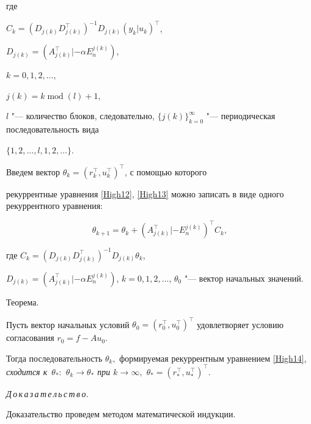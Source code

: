 где 

$C_{k}=(D_{j(k)}D^{\top}_{j(k)})^{-1}D_{j(k)}(y_{k}|u_{k})^{\top}$, 

$D_{j(k)}=(A^{\top}_{j(k)}|-\alpha E^{j(k)}_{n})$,

$k=0, 1, 2,\ldots$,

$j(k)=k \mathop{\mathrm{mod}}(l)+1,$

$l$ "--- количество блоков, следовательно, $\{j(k)\}^{\infty}_{k=0}$ "--- периодическая последовательность вида 

$\{1, 2, \ldots, l, 1, 2, \ldots\}.$



Введем вектор $\theta _{k}= (r^{\top}_{k},u^{\top}_{k})^{\top}$, с помощью которого 

рекуррентные уравнения  \eqref{High12}, \eqref{High13} можно записать в виде одного рекуррентного уравнения:

\begin{equation}

\theta_{k+1}=\theta_{k}+(A^{\top}_{j(k)}|-E^{j(k)}_{n})^{\top}C_{k},

\label{High14}

\end{equation}

где $C_{k}=(D_{j(k)}D^{\top}_{j(k)})^{-1}D_{j(k)}\theta_{k}$,

$D_{j(k)}=(A^{\top}_{j(k)}|-\alpha E^{j(k)}_{n})$, $k=0, 1, 2, \ldots$, $\theta_{0}$ "--- вектор начальных значений.



\smallskip



{\small \sc Теорема.} \it

Пусть вектор начальных условий $\theta_{0}=(r^{\top}_{0}, u^{\top}_{0})^{\top}$ удовлетворяет условию согласования $r_{0}=f-Au_{0}.$

Тогда последовательность $\theta_{k},$ формируемая рекуррентным уравнением \rm \eqref{High14}, \it сходится к~$\theta_{\ast}{:}$ $\theta_{k} \rightarrow \theta_{\ast}$ при $k \rightarrow \infty,$ $\theta_{\ast}=(r^{\top}_{\ast},u^{\top}_{\ast})^{\top}.$



\rm



\smallskip



{\it Д\,о\,к\,а\,з\,а\,т\,е\,л\,ь\,с\,т\,в\,о.}

Доказательство проведем методом математической индукции. 

